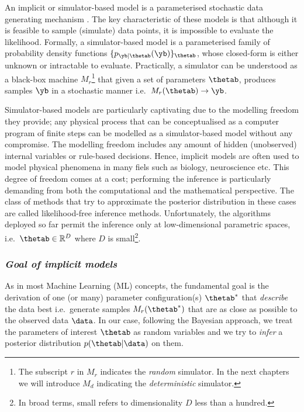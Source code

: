 An implicit or simulator-based model is a parameterised stochastic
data generating mechanism \cite{Gutmann2016}. The key characteristic
of these models is that although it is feasible to sample (simulate) data points, it is impossible to evaluate the likelihood. Formally, a simulator-based model is a
parameterised family of probability density functions
$\{ p_{\yb|\thetab}(\yb) \}_{\thetab}$, whose closed-form is either
unknown or intractable to evaluate. Practically, a simulator can be understood as a black-box
machine $M_r$\footnote{The subscript $r$ in $M_r$ indicates the
  \textit{random} simulator. In the next chapters we will introduce
  $M_d$ indicating the \textit{deterministic} simulator.} that
given a set of parameters $\thetab$, produces samples $\yb$ in a
stochastic manner i.e.\ $M_r(\thetab) \rightarrow \yb$.

Simulator-based models are particularly captivating due to the
modelling freedom they provide; any physical process that can be
conceptualised as a computer program of finite steps can be modelled
as a simulator-based model without any compromise. The modelling
freedom includes any amount of hidden (unobserved) internal variables
or rule-based decisions. Hence, implicit models are often used to
model physical phenomena in many fiels such as biology, neuroscience
etc. This degree of freedom comes at a cost; performing the inference
is particularly demanding from both the computational and the
mathematical perspective. The class of methods that try to approximate
the posterior distribution in these cases are called likelihood-free
inference methods. Unfortunately, the algorithms deployed so far
permit the inference only at low-dimensional parametric spaces,
i.e.\ $\thetab \in \mathbb{R}^D$ where $D$ is small\footnote{In broad terms, small refers to dimensionality $D$ less than a hundred.}.

\subsubsection*{\textit{Goal of implicit models}}

As in most Machine Learning (ML) concepts, the fundamental goal is the
derivation of one (or many) parameter configuration(s) $\thetab^*$
that \textit{describe} the data best i.e.\ generate
samples $M_r(\thetab^*)$ that are as close as possible to the observed
data $\data$. In our case, following the Bayesian approach, we treat
the parameters of interest $\thetab$ as random variables and we try to
\textit{infer} a posterior distribution $p(\thetab|\data)$ on them.
